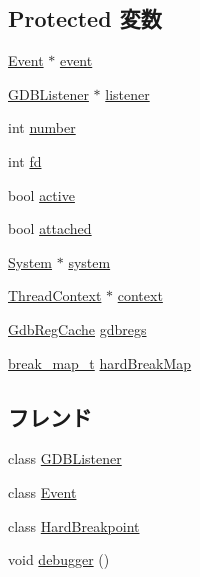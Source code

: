 \subsection*{Protected 変数}
\begin{DoxyCompactItemize}
\item 
\hyperlink{classBaseRemoteGDB_1_1Event}{Event} $\ast$ \hyperlink{classBaseRemoteGDB_a765488c8f26c7f8713d5245212dcae01}{event}
\item 
\hyperlink{classGDBListener}{GDBListener} $\ast$ \hyperlink{classBaseRemoteGDB_a70415b68fb0739613a991b92c4d127a5}{listener}
\item 
int \hyperlink{classBaseRemoteGDB_a7106e2abc437ad981830d14176d15f09}{number}
\item 
int \hyperlink{classBaseRemoteGDB_a6f8059414f0228f0256115e024eeed4b}{fd}
\item 
bool \hyperlink{classBaseRemoteGDB_a03c996f9fcf0e10baeb3e700be0c409a}{active}
\item 
bool \hyperlink{classBaseRemoteGDB_a571d1b910d429b292be1f1c555733f62}{attached}
\item 
\hyperlink{classSystem}{System} $\ast$ \hyperlink{classBaseRemoteGDB_af27ccd765f13a4b7bd119dc7579e2746}{system}
\item 
\hyperlink{classThreadContext}{ThreadContext} $\ast$ \hyperlink{classBaseRemoteGDB_a9684dd9218c7836517670f8a0d8f3df7}{context}
\item 
\hyperlink{classBaseRemoteGDB_1_1GdbRegCache}{GdbRegCache} \hyperlink{classBaseRemoteGDB_a4dbf55c54f47727c96b2cb5d00ca7936}{gdbregs}
\item 
\hyperlink{classBaseRemoteGDB_a1d52d0c05b8ee640ddcd82fe5ec33593}{break\_\-map\_\-t} \hyperlink{classBaseRemoteGDB_a9786e8b1280562520a5041f18dd59b21}{hardBreakMap}
\end{DoxyCompactItemize}
\subsection*{フレンド}
\begin{DoxyCompactItemize}
\item 
class \hyperlink{classBaseRemoteGDB_a9759bc7ba80437d060e93ffb17361c55}{GDBListener}
\item 
class \hyperlink{classBaseRemoteGDB_a3c7b3c89bf96f51e80a919b3a82a3915}{Event}
\item 
class \hyperlink{classBaseRemoteGDB_ad185c0396aa4b55d7f1fbb3749759247}{HardBreakpoint}
\item 
void \hyperlink{classBaseRemoteGDB_a19c86e0d31779f284e91d4d016448264}{debugger} ()
\end{DoxyCompactItemize}


